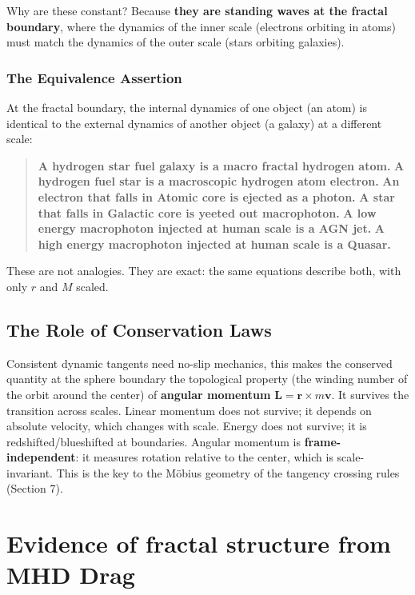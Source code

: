 \documentclass[11pt,a4paper]{article}
\begin{document}
    Why are these constant? Because \textbf{they are standing waves at the fractal boundary}, where the dynamics of the inner scale (electrons orbiting in atoms) must match the dynamics of the outer scale (stars orbiting galaxies).

    \subsubsection{The Equivalence Assertion}

    At the fractal boundary, the internal dynamics of one object (an atom) is identical to the external dynamics of another object (a galaxy) at a different scale:

    \begin{quote}
    \textbf{A hydrogen star fuel galaxy is a macro fractal hydrogen atom.}
    \textbf{A hydrogen fuel star is a macroscopic hydrogen atom electron.}
    \textbf{An electron that falls in Atomic core is ejected as a photon.}
    \textbf{A star that falls in Galactic core is yeeted out macrophoton.}
    \textbf{A low energy macrophoton injected at human scale is a AGN jet.}
    \textbf{A high energy macrophoton injected at human scale is a Quasar.}
    \end{quote}

    These are not analogies. They are exact: the same  equations describe both, with only $r$ and $M$ scaled.

  \subsection{The Role of Conservation Laws}

    Consistent dynamic tangents need no-slip mechanics, this makes the conserved quantity at the sphere boundary the topological property (the winding number of the orbit around the center) of \textbf{angular momentum} $\mathbf{L} = \mathbf{r} \times m\mathbf{v}$. It survives the transition across scales. Linear momentum does not survive; it depends on absolute velocity, which changes with scale. Energy does not survive; it is redshifted/blueshifted at boundaries. Angular momentum is \textbf{frame-independent}: it measures rotation relative to the center, which is scale-invariant. This is the key to the Möbius geometry of the tangency crossing rules (Section 7).


\section{Evidence of fractal structure from MHD Drag}
\end{document}
